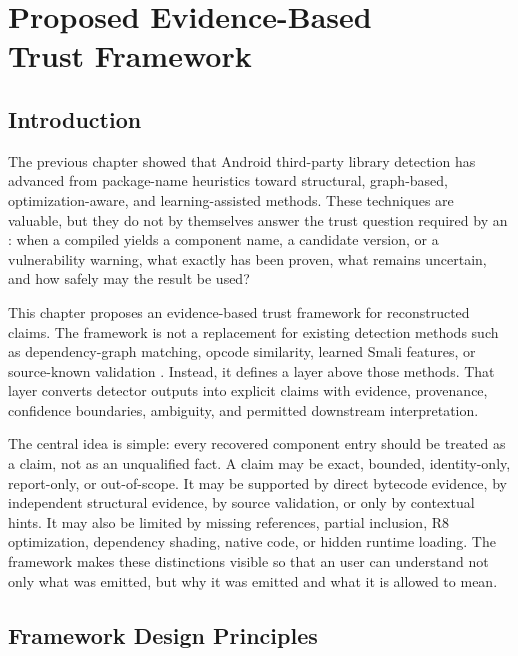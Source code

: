 \chapter[Proposed Evidence-Based Trust Framework]{Proposed Evidence-Based\\ Trust Framework}
\label{ch:master-framework}

\section{Introduction}

The previous chapter showed that Android third-party library detection has
advanced from package-name heuristics toward structural, graph-based,
optimization-aware, and learning-assisted methods. These techniques are
valuable, but they do not by themselves answer the trust question required by
an \SBOM: when a compiled \APK yields a component name, a candidate version,
or a vulnerability warning, what exactly has been proven, what remains
uncertain, and how safely may the result be used?

This chapter proposes an evidence-based trust framework for reconstructed
\SBOM claims. The framework is not a replacement for existing detection
methods such as dependency-graph matching, opcode similarity, learned Smali
features, or source-known validation \cite{zhan2021systematic,zhan2021atvhunter,pan2025libattention,zhou2025sad}.
Instead, it defines a layer above those methods. That layer converts detector
outputs into explicit claims with evidence, provenance, confidence boundaries,
ambiguity, and permitted downstream interpretation.

The central idea is simple: every recovered component entry should be treated
as a claim, not as an unqualified fact. A claim may be exact, bounded,
identity-only, report-only, or out-of-scope. It may be supported by direct
bytecode evidence, by independent structural evidence, by source validation,
or only by contextual hints. It may also be limited by missing references,
partial inclusion, R8 optimization, dependency shading, native code, or hidden
runtime loading. The framework makes these distinctions visible so that an
\SBOM user can understand not only what was emitted, but why it was emitted
and what it is allowed to mean.

\section{Framework Design Principles}

